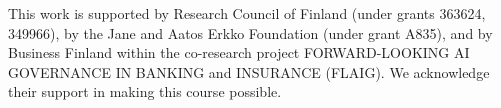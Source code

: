 \documentclass[journal,12pt,onecolumn]{article}
\begin{document}
This work is supported by Research Council of 
Finland (under grants 363624, 349966), by the Jane and Aatos Erkko Foundation (under grant A835), and by Business 
Finland within the co-research project FORWARD-LOOKING AI GOVERNANCE IN BANKING and INSURANCE (FLAIG). 
We acknowledge their support in making this course possible.




\newpage 


\newpage
\glsaddallunused
\printglossary[nonumberlist]


\newpage
{}
\pagestyle{empty}  %
\printindex  %




\newpage


\end{document}
